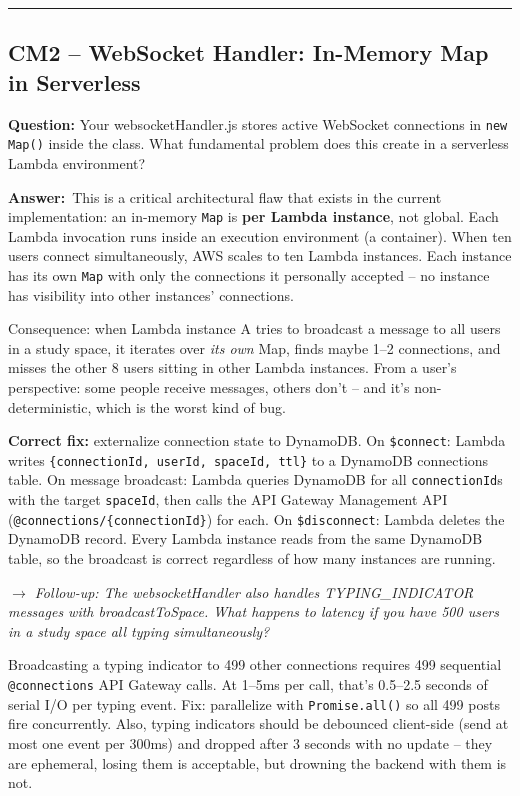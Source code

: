 \documentclass[letterpaper,10pt]{article}
\newlength{\boxwidth}
\newcommand{\questionbox}[1]{%
  \vspace{6pt}%
  \noindent\colorbox{qbg}{%
    \begin{minipage}{\boxwidth}%
      \vspace{3pt}\textbf{\textcolor{nordblue}{Question:}} #1\vspace{3pt}%
    \end{minipage}%
  }\vspace{2pt}%
}
\newcommand{\answerlabel}{\noindent\textbf{\textcolor{answerblue}{Answer:}}~}
\newcommand{\followup}[1]{\smallskip\noindent\textit{\textcolor{nordblue}{$\rightarrow$ Follow-up: #1}}\smallskip}
\begin{document}
\medskip\rule{\linewidth}{0.2pt}

\subsection*{CM2 -- WebSocket Handler: In-Memory Map in Serverless}

\questionbox{Your websocketHandler.js stores active WebSocket connections in \texttt{new Map()} inside the class. What fundamental problem does this create in a serverless Lambda environment?}

\answerlabel This is a critical architectural flaw that exists in the current implementation: an in-memory \texttt{Map} is \textbf{per Lambda instance}, not global. Each Lambda invocation runs inside an execution environment (a container). When ten users connect simultaneously, AWS scales to ten Lambda instances. Each instance has its own \texttt{Map} with only the connections it personally accepted -- no instance has visibility into other instances' connections.

Consequence: when Lambda instance A tries to broadcast a message to all users in a study space, it iterates over \textit{its own} Map, finds maybe 1--2 connections, and misses the other 8 users sitting in other Lambda instances. From a user's perspective: some people receive messages, others don't -- and it's non-deterministic, which is the worst kind of bug.

\textbf{Correct fix:} externalize connection state to DynamoDB. On \texttt{\$connect}: Lambda writes \texttt{\{connectionId, userId, spaceId, ttl\}} to a DynamoDB connections table. On message broadcast: Lambda queries DynamoDB for all \texttt{connectionId}s with the target \texttt{spaceId}, then calls the API Gateway Management API (\texttt{@connections/\{connectionId\}}) for each. On \texttt{\$disconnect}: Lambda deletes the DynamoDB record. Every Lambda instance reads from the same DynamoDB table, so the broadcast is correct regardless of how many instances are running.

\followup{The websocketHandler also handles TYPING\_INDICATOR messages with broadcastToSpace. What happens to latency if you have 500 users in a study space all typing simultaneously?}

\noindent Broadcasting a typing indicator to 499 other connections requires 499 sequential \texttt{@connections} API Gateway calls. At 1--5ms per call, that's 0.5--2.5 seconds of serial I/O per typing event. Fix: parallelize with \texttt{Promise.all()} so all 499 posts fire concurrently. Also, typing indicators should be debounced client-side (send at most one event per 300ms) and dropped after 3 seconds with no update -- they are ephemeral, losing them is acceptable, but drowning the backend with them is not.
\end{document}
